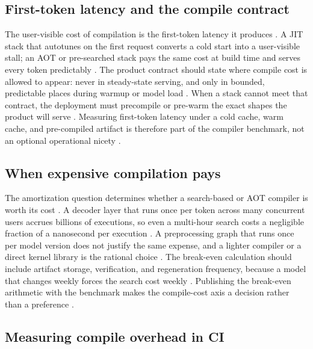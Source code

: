 \subsection{First-token latency and the compile contract}

The user-visible cost of compilation is the first-token latency it produces \citep{kwon2023vllm,patel2025llminference}. A JIT stack that autotunes on the first request converts a cold start into a user-visible stall; an AOT or pre-searched stack pays the same cost at build time and serves every token predictably \citep{tritonlang2024,iree2024}. The product contract should state where compile cost is allowed to appear: never in steady-state serving, and only in bounded, predictable places during warmup or model load \citep{patel2025llminference,taxbreak2026}. When a stack cannot meet that contract, the deployment must precompile or pre-warm the exact shapes the product will serve \citep{kwon2023vllm,chen2020compilerbasedhardw}. Measuring first-token latency under a cold cache, warm cache, and pre-compiled artifact is therefore part of the compiler benchmark, not an optional operational nicety \citep{memoryfloor2026,patel2025llminference}.

\subsection{When expensive compilation pays}

The amortization question determines whether a search-based or AOT compiler is worth its cost \citep{wu2024mirage,kwon2023vllm}. A decoder layer that runs once per token across many concurrent users accrues billions of executions, so even a multi-hour search costs a negligible fraction of a nanosecond per execution \citep{taxbreak2026,wu2024mirage}. A preprocessing graph that runs once per model version does not justify the same expense, and a lighter compiler or a direct kernel library is the rational choice \citep{chen2020compilerbasedhardw,memoryfloor2026}. The break-even calculation should include artifact storage, verification, and regeneration frequency, because a model that changes weekly forces the search cost weekly \citep{wu2024mirage,patel2025llminference}. Publishing the break-even arithmetic with the benchmark makes the compile-cost axis a decision rather than a preference \citep{taxbreak2026,memoryfloor2026}.

\subsection{Measuring compile overhead in CI}

